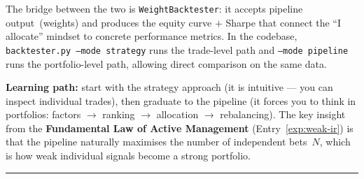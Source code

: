 \documentclass[a4paper, 11pt]{report}
\theoremstyle{definition}
\theoremstyle{remark}
\begin{document}
\begin{description}[style=nextline, leftmargin=1.8cm]
        \medskip
        The bridge between the two is \texttt{WeightBacktester}:
        it accepts pipeline output~(weights) and produces the equity
        curve $+$ Sharpe that connect the ``I allocate'' mindset to
        concrete performance metrics.  In the codebase,
        \texttt{backtester.py --mode strategy} runs the trade-level path
        and \texttt{--mode pipeline} runs the portfolio-level path,
        allowing direct comparison on the same data.

        \medskip
        \textbf{Learning path:} start with the strategy approach (it is
        intuitive --- you can inspect individual trades), then graduate
        to the pipeline (it forces you to think in portfolios:
        factors $\to$ ranking $\to$ allocation $\to$ rebalancing).
        The key insight from the \textbf{Fundamental Law of Active
        Management} (Entry~\ref{exp:weak-ir}) is that the pipeline
        naturally maximises the number of independent bets~$N$, which
        is how weak individual signals become a strong portfolio.
\end{description}

\bigskip\noindent\rule{\textwidth}{0.4pt}
\end{document}
